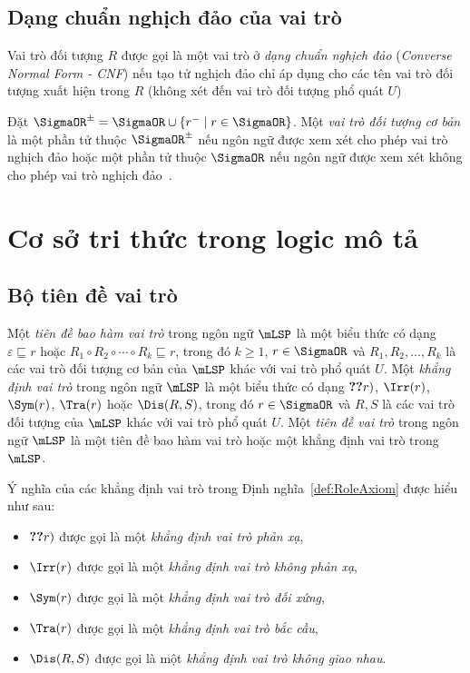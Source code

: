 \subsection{Dạng chuẩn nghịch đảo của vai trò}
\label{sec:Chap1.InverseNormalForm}
Vai trò đối tượng $R$ được gọi là một vai trò ở {\em dạng chuẩn nghịch đảo} ({\em Converse Normal Form - CNF}) nếu tạo tử nghịch đảo chỉ áp dụng cho các tên vai trò đối tượng xuất hiện trong $R$ (không xét đến vai trò đối tượng phổ quát $U$)

Đặt $\SigmaOR^\pm = \SigmaOR \cup \{r^- \mid r \in \SigmaOR\}$. Một {\em vai trò đối tượng cơ bản} là một phần tử thuộc $\SigmaOR^\pm$ nếu ngôn ngữ được xem xét cho phép vai trò nghịch đảo hoặc một phần tử thuộc $\SigmaOR$ nếu ngôn ngữ được xem xét không cho phép vai trò nghịch đảo~\cite{Divroodi2011B}.

\section{Cơ sở tri thức trong logic mô tả}
\label{sec:Chap1.KnowledgeBaseInDL}

\subsection{Bộ tiên đề vai trò}
\label{sec:Chap1.RBox}
\begin{Definition}
\label{def:RoleAxiom}
	Một {\em tiên đề bao hàm vai trò} trong ngôn ngữ $\mLSP$ là một biểu thức có dạng $\varepsilon \sqsubseteq r$ hoặc $R_1 \circ R_2 \circ \cdots \circ R_k \sqsubseteq r$, trong đó $k \geq 1$, $r \in \SigmaOR$ và $R_1, R_2, \ldots,R_k$ là các vai trò đối tượng cơ bản của $\mLSP$ khác với vai trò phổ quát $U$. 
%
	Một {\em khẳng định vai trò} trong ngôn ngữ $\mLSP$ là một biểu thức có dạng $\Ref(r)$, $\Irr(r)$, $\Sym(r)$, $\Tra(r)$ hoặc $\Dis(R, S)$, trong đó $r \in \SigmaOR$ và $R, S$ là các vai trò đối tượng của $\mLSP$ khác với vai trò phổ quát $U$.
%
	Một {\em tiên đề vai trò} trong ngôn ngữ $\mLSP$ là một tiên đề bao hàm vai trò hoặc một khẳng định vai trò trong $\mLSP$.\myend
\end{Definition}

Ý nghĩa của các khẳng định vai trò trong Định nghĩa~\ref{def:RoleAxiom} được hiểu như sau:
\begin{itemize}
	\item $\Ref(r)$ được gọi là một {\em khẳng định vai trò phản xạ},
	\item $\Irr(r)$ được gọi là một {\em khẳng định vai trò không phản xạ},
	\item $\Sym(r)$ được gọi là một {\em khẳng định vai trò đối xứng},
	\item $\Tra(r)$ được gọi là một {\em khẳng định vai trò bắc cầu},
	\item $\Dis(R,S)$ được gọi là một {\em khẳng định vai trò không giao nhau}.        
\end{itemize}

